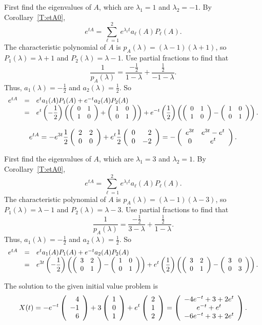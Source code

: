 \soln First find the eigenvalues of $A$, which are $\lambda_1 = 1$ and
$\lambda_2 = -1$.  By Corollary~\ref{T:etA0},
\[
e^{tA} = \sum_{\ell = 1}^2 e^{\lambda_\ell t}a_\ell(A)P_\ell(A).
\]
The characteristic polynomial of $A$ is $p_A(\lambda) = (\lambda -
1)(\lambda + 1)$, so $P_1(\lambda) = \lambda + 1$ and $P_2(\lambda) =
\lambda - 1$.  Use partial fractions to find that
\[
\frac{1}{p_A(\lambda)} = \frac{-\frac{1}{2}}{1 - \lambda} + \frac{\frac{1}{2}}
{-1 - \lambda}.
\]
Thus, $a_1(\lambda) = -\frac{1}{2}$ and $a_2(\lambda) = \frac{1}{2}$.  So
\[
\begin{array}{rcl}
e^{tA} & = & e^ta_1(A)P_1(A) + e^{-t}a_2(A)P_2(A) \\
& = & \displaystyle e^t\left(-\frac{1}{2}\right)\left(\left(\begin{array}{rr} 0 & 1\\ 1 &0\end{array}\right) +
\left(\begin{array}{rr} 1 & 0\\ 0 &1\end{array}\right)\right) + e^{-t}\left(\frac{1}{2}\right)
\left(\left(\begin{array}{rr} 0 & 1\\ 1 &0\end{array}\right) - \left(\begin{array}{rr} 1 & 0\\ 0 &1\end{array}\right)\right).
\end{array}
\]

 \ans
\[
e^{tA} = -e^{3t}\frac{1}{2}\left(\begin{array}{rr} 2 & 2\\ 0 &0\end{array}\right) +
e^t\frac{1}{2}\left(\begin{array}{rr} 0 & 2\\ 0 &-2\end{array}\right)
= -\left(\begin{array}{cc} e^{3t} & e^{3t} - e^{t}\\ 0 &e^{t}\end{array}\right).
\]

\soln First find the eigenvalues of $A$, which are $\lambda_1 = 3$ and
$\lambda_2 = 1$.  By Corollary~\ref{T:etA0},
\[
e^{tA} = \sum_{\ell = 1}^2 e^{\lambda_\ell t}a_\ell(A)P_\ell(A).
\]
The characteristic polynomial of $A$ is $p_A(\lambda) = (\lambda -
1)(\lambda - 3)$, so $P_1(\lambda) = \lambda - 1$ and $P_2(\lambda) =
\lambda - 3$.  Use partial fractions to find that
\[
\frac{1}{p_A(\lambda)} = \frac{-\frac{1}{2}}{3 - \lambda} + \frac{\frac{1}{2}}
{1 - \lambda}.
\]
Thus, $a_1(\lambda) = -\frac{1}{2}$ and $a_2(\lambda) = \frac{1}{2}$.  So
\[
\begin{array}{rcl}
e^{tA} & = & e^ta_1(A)P_1(A) + e^{-t}a_2(A)P_2(A) \\
& = & \displaystyle e^{3t}\left(-\frac{1}{2}\right)\left(\left(\begin{array}{rr} 3 & 2\\ 0 &1\end{array}\right) -
\left(\begin{array}{rr} 1 & 0\\ 0 &1\end{array}\right)\right) + e^{t}\left(\frac{1}{2}\right)
\left(\left(\begin{array}{rr} 3 & 2\\ 0 &1\end{array}\right) - \left(\begin{array}{rr} 3 & 0\\ 0 &3\end{array}\right)\right).
\end{array}
\]

 \ans The solution to the given initial value problem is
\[
X(t) = -e^{-t}\left(\begin{array}{r} 4 \\ -1 \\ 6\end{array}\right) +
3\left(\begin{array}{r} 1 \\ 0 \\ 1\end{array}\right) + e^t\left(\begin{array}{r} 2 \\ 1 \\ 2\end{array}\right)
= \left(\begin{array}{c} -4e^{-t} + 3 + 2e^t \\ e^{-t} + e^t \\ -6e^{-t} + 3 + 2e^t\end{array}\right).
\]

